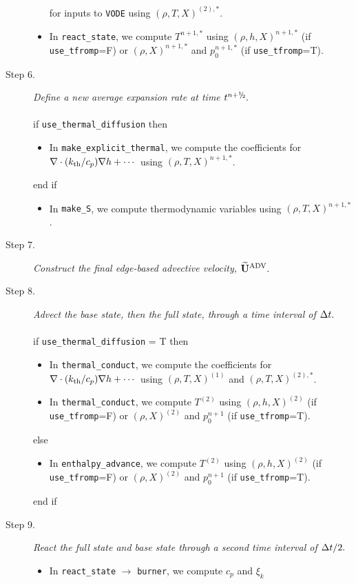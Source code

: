 \begin{description}
\begin{itemize}
for inputs to {\tt VODE} using $(\rho,T,X)^{(2),*}$.
\item In {\tt react\_state}, we compute $T^{n+1,*}$ using $(\rho,h,X)^{n+1,*}$ 
(if {\tt use\_tfromp}=F) or $(\rho,X)^{n+1,*}$ and $p_0^{n+1,*}$ (if {\tt use\_tfromp}=T).
\end{itemize}
\item[Step 6.] {\em Define a new average expansion rate at time $t^\nph.$}\\ \\
if {\tt use\_thermal\_diffusion} then
\begin{itemize}
\item In {\tt make\_explicit\_thermal}, we compute the coefficients for 
$\nabla\cdot(k_{\rm th}/c_p)\nabla h + \cdots$ using $(\rho,T,X)^{n+1,*}$.
\end{itemize}
end if
\begin{itemize}
\item In {\tt make\_S}, we compute thermodynamic variables using $(\rho,T,X)^{n+1,*}$.
\end{itemize}
\item[Step 7.] {\em Construct the final edge-based advective velocity, $\widetilde{\mathbf{U}}^{\mathrm{ADV}}.$}
\item[Step 8.] {\em Advect the base state, then the full state, through a time interval 
of $\Delta t.$}\\ \\
if {\tt use\_thermal\_diffusion} = T then
\begin{itemize}
\item In {\tt thermal\_conduct}, we compute the coefficients for 
$\nabla\cdot(k_{\rm th}/c_p)\nabla h + \cdots$ using $(\rho,T,X)^{(1)}$ and $(\rho,T,X)^{(2),*}$.
\item In {\tt thermal\_conduct}, we compute $T^{(2)}$ using $(\rho,h,X)^{(2)}$
(if {\tt use\_tfromp}=F) or $(\rho,X)^{(2)}$ and $p_0^{n+1}$ (if {\tt use\_tfromp}=T).
\end{itemize}
else
\begin{itemize}
\item In {\tt enthalpy\_advance}, we compute $T^{(2)}$ using $(\rho,h,X)^{(2)}$
(if {\tt use\_tfromp}=F) or $(\rho,X)^{(2)}$ and $p_0^{n+1}$ (if {\tt use\_tfromp}=T).
\end{itemize}
end if
\item[Step 9.] {\em React the full state and base state through a second time interval 
of $\Delta t/2.$}
\begin{itemize}
\item In {\tt react\_state} $\rightarrow$ {\tt burner}, we compute $c_p$ and $\xi_k$ 

\end{itemize}
\end{description}
